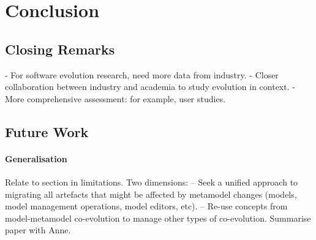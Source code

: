 
\chapter{Conclusion}
\label{Conclusion}

% 
% 



\section{Closing Remarks}
- For software evolution research, need more data from industry.
- Closer collaboration between industry and academia to study evolution in context.
- More comprehensive assessment: for example, user studies.

\section{Future Work}
\label{sec:future_work}

\subsubsection{Generalisation}
Relate to section in limitations. Two dimensions:
-- Seek a unified approach to migrating all artefacts that might be affected by metamodel changes (models, model management operations, model editors, etc).
-- Re-use concepts from model-metamodel co-evolution to manage other types of co-evolution. Summarise paper with Anne.

